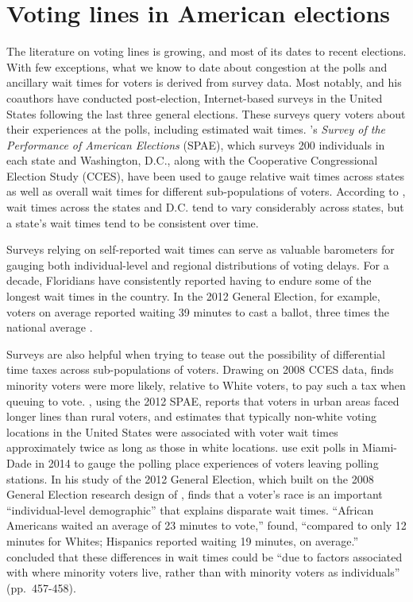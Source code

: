 \documentclass[12pt,titlepage]{article}
\begin{document}
\section*{Voting lines in American elections}

The literature on voting lines is growing, and most of its dates to
recent elections.  With few exceptions, what we know to date about
congestion at the polls and ancillary wait times for voters is derived
from survey data. Most notably, \citet{stewart:waitingtovote2012} and
his coauthors have conducted post-election, Internet-based surveys in
the United States following the last three general elections.  These
surveys query voters about their experiences at the polls, including
estimated wait times.  \citeauthor{stewart:waitingtovote2012}'s
\emph{Survey of the Performance of American Elections} (SPAE), which
surveys 200 individuals in each state and Washington, D.C., along with
the Cooperative Congressional Election Study (CCES), have been used to
gauge relative wait times across states as well as overall wait times
for different sub-populations of voters.  According to
\citeauthor{stewart:waitingtovote2012}, wait times across the states
and D.C. tend to vary considerably across states, but a state's wait
times tend to be consistent over time.

Surveys relying on self-reported wait times can serve as valuable
barometers for gauging both individual-level and regional
distributions of voting delays.  For a decade, Floridians have
consistently reported having to endure some of the longest wait times
in the country. In the 2012 General Election, for example, voters on
average reported waiting 39 minutes to cast a ballot, three times the
national average \citep{stewart:waitingtovote2012}.

Surveys are also helpful when trying to tease out the possibility of
differential time taxes across sub-populations of voters.  Drawing on
2008 CCES data, \cite{mukherjee:timetax} finds minority voters were
more likely, relative to White voters, to pay such a tax when queuing
to vote. \citet{kimball:voting}, using the 2012 SPAE, reports that
voters in urban areas faced longer lines than rural voters, and
\citet{pettigrew:racegapwaittimes} estimates that typically non-white
voting locations in the United States were associated with voter wait
times approximately twice as long as those in white locations.
\cite{herron:confidence} use exit polls in Miami-Dade in 2014 to gauge
the polling place experiences of voters leaving polling stations.  In
his study of the 2012 General Election, which built on the 2008
General Election research design of \citet{alvarez:survey},
\cite{stewart:waitingtovote2012} finds that a voter's race is an
important ``individual-level demographic'' that explains disparate
wait times.  ``African Americans waited an average of 23 minutes to
vote,'' \citeauthor{stewart:waitingtovote2012} found, ``compared to
only 12 minutes for Whites; Hispanics reported waiting 19 minutes, on
average.''  \citeauthor{stewart:waitingtovote2012} concluded that
these differences in wait times could be ``due to factors associated
with where minority voters live, rather than with minority voters as
individuals'' (pp.\ 457-458).
\end{document}
